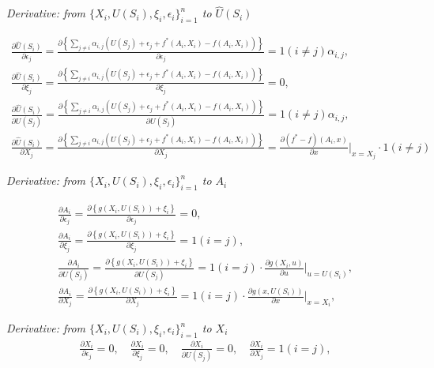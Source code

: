\documentclass[12pt]{article}
\begin{document}
\noindent\textit{Derivative: from $\{X_i,U(S_i),\xi_i,\epsilon_i\}_{i=1}^n$ to $\widehat U(S_i)$}

\begin{gather*}
    \frac{\partial \widehat U(S_i)}{\partial \epsilon_j} =\frac{\partial \left\{\sum_{j\neq i}\alpha_{i,j}(U(S_j)+\epsilon_j+f^*(A_i,X_i) - f(A_i,X_i))\right\}}{\partial \epsilon_j}= 1(i\neq j)\alpha_{i,j}, \\
    \frac{ \partial \widehat U(S_i)}{\partial \xi_j} =\frac{\partial \left\{\sum_{j\neq i}\alpha_{i,j}(U(S_j)+\epsilon_j+f^*(A_i,X_i) - f(A_i,X_i))\right\}}{\partial \xi_j}= 0,\\
     \frac{\partial \widehat U(S_i)}{\partial U(S_j)} =\frac{\partial \left\{\sum_{j\neq i}\alpha_{i,j}(U(S_j)+\epsilon_j+f^*(A_i,X_i) - f(A_i,X_i))\right\}}{\partial U(S_j)}= 1(i\neq j)\alpha_{i,j},\\
     \frac{\partial \widehat U(S_i)}{\partial X_j} =\frac{\partial \left\{\sum_{j\neq i}\alpha_{i,j}(U(S_j)+\epsilon_j+f^*(A_i,X_i) - f(A_i,X_i))\right\}}{\partial X_j}= \frac{\partial (f^* - f)(A_i,x)}{\partial x}\bigg|_{x = X_j}\cdot 1(i\neq j)
\end{gather*}

\noindent\textit{Derivative: from $\{X_i,U(S_i),\xi_i,\epsilon_i\}_{i=1}^n$ to $A_i$}

\begin{gather*}
    \frac{\partial A_i}{\partial \epsilon_j} =\frac{\partial \left\{g(X_i,U(S_i))+\xi_i\right\}}{\partial \epsilon_j}= 0, \\
    \frac{ \partial A_i}{\partial \xi_j} =\frac{\partial \left\{g(X_i,U(S_i))+\xi_i\right\}}{\partial \xi_j}= 1(i=j),\\
     \frac{\partial A_i}{\partial U(S_j)} =\frac{\partial \left\{g(X_i,U(S_i))+\xi_i\right\}}{\partial U(S_j)}= 1(i= j)\cdot \frac{\partial g(X_i,u)}{\partial u}\bigg|_{u = U(S_i)},\\
     \frac{\partial A_i}{\partial X_j} =\frac{\partial \left\{g(X_i,U(S_i))+\xi_i\right\}}{\partial X_j}= 1(i= j)\cdot \frac{\partial g(x,U(S_i))}{\partial x}\bigg|_{x = X_i},
\end{gather*}

\noindent\textit{Derivative: from $\{X_i,U(S_i),\xi_i,\epsilon_i\}_{i=1}^n$ to $X_i$} 
\begin{gather*}
    \frac{\partial X_i}{\partial \epsilon_j} = 0, \quad
    \frac{ \partial X_i}{\partial \xi_j} =0,\quad
     \frac{\partial X_i}{\partial U(S_j)} = 0,\quad
     \frac{\partial X_i}{\partial X_j} =1(i=j),
\end{gather*}
\end{document}
